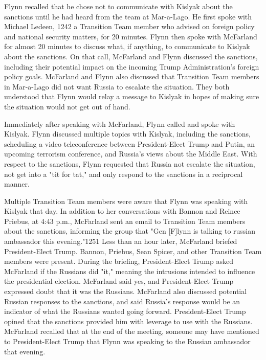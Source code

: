 Flynn recalled that he chose not to communicate with Kislyak about the sanctions until he had heard from the team at Mar-a-Lago.%
He first spoke with Michael Ledeen, 1242 a Transition Team member who advised on foreign policy and national security matters, for 20 minutes.%
Flynn then spoke with McFarland for almost 20 minutes to discuss what, if anything, to communicate to Kislyak about the sanctions.%
On that call, McFarland and Flynn discussed the sanctions, including their potential impact on the incoming Trump Administration's foreign policy goals.%
McFarland and Flynn also discussed that Transition Team members in Mar-a-Lago did not want Russia to escalate the situation.%
They both understood that Flynn would relay a message to Kislyak in hopes of making sure the situation would not get out of hand.%

Immediately after speaking with McFarland, Flynn called and spoke with Kislyak.%
Flynn discussed multiple topics with Kislyak, including the sanctions, scheduling a video teleconference between President-Elect Trump and Putin, an upcoming terrorism conference, and Russia's views about the Middle East.%
With respect to the sanctions, Flynn requested that Russia not escalate the situation, not get into a "tit for tat," and only respond to the sanctions in a reciprocal manner.%

Multiple Transition Team members were aware that Flynn was speaking with Kislyak that day. In addition to her conversations with Bannon and Reince Priebus, at 4:43 p.m., McFarland sent an email to Transition Team members about the sanctions, informing the group that "Gen [F]lynn is talking to russian ambassador this evening."1251 Less than an hour later, McFarland briefed President-Elect Trump. Bannon, Priebus, Sean Spicer, and other Transition Team members were present.%
During the briefing, President-Elect Trump asked McFarland if the Russians did "it," meaning the intrusions intended to influence the presidential election.%
McFarland said yes, and President-Elect Trump expressed doubt that it was the Russians.%
McFarland also discussed potential Russian responses to the sanctions, and said Russia's response would be an indicator of what the Russians wanted going forward.%
President-Elect Trump opined that the sanctions provided him with leverage to use with the Russians.%
McFarland recalled that at the end of the meeting, someone may have mentioned to President-Elect Trump that Flynn was speaking to the Russian ambassador that evening.%

